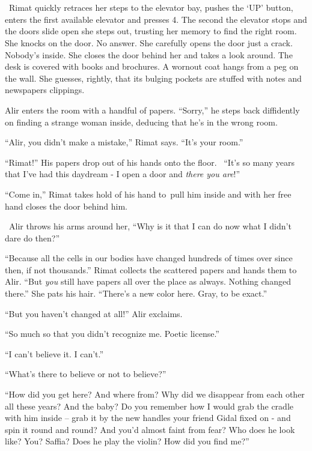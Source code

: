 \documentclass[twoside,11pt]{book}
\begin{document}
\chapter{}

~Rimat quickly retraces her steps to the elevator bay, pushes the `UP' button, enters the first available elevator and
presses 4. The second the elevator stops and the doors slide open she steps out, trusting her memory to find the right
room. She knocks on the door. No answer. She carefully opens the door just a crack. Nobody's inside. She closes the
door behind her and takes a look around. The desk is covered with books and brochures. A wornout coat hangs from a peg
on the wall. She guesses, rightly, that its bulging pockets are stuffed with notes and{ }newspapers
clippings.

Alir enters the room with a handful of papers. ``Sorry,'' he steps back diffidently on finding
a strange woman inside, deducing that he's in the wrong room.

``Alir, you didn't make a mistake,'' Rimat says. ``It's your room.''


``Rimat!'' His papers drop out of his hands onto the floor.~ ``It's so many years
that I've had this daydream - I open a door and \textit{there you are}!''

``Come in,'' Rimat takes hold of his hand to~pull him inside and with her free hand closes the
door behind him.

~Alir throws his arms around her, ``Why is it that I can do now what I didn't dare do then?''

``Because all the cells in our bodies have changed hundreds of times over since then, if not
thousands.'' Rimat collects the scattered papers and hands them to Alir. ``But \textit{you}
still have papers all over the place as always. Nothing changed there.'' She pats his hair.
``There's a new color here. Gray, to be exact.''

``But you haven't changed at all!'' Alir exclaims.

``So much so that you didn't recognize me. Poetic license.''

``I can't believe it. I can't.''

``What's there to believe or not to believe?''

``How did you get here? And where from? Why did we disappear from each other all these years? And the baby?
Do you remember how I would grab the cradle with him inside -- grab it by the new handles your friend Gidal
fixed{ }on{ }{}- and
spin it round and round? And you'd almost faint from fear? Who does he look like? You? Saffia? Does he play the violin?
How did you find me?''
\end{document}
